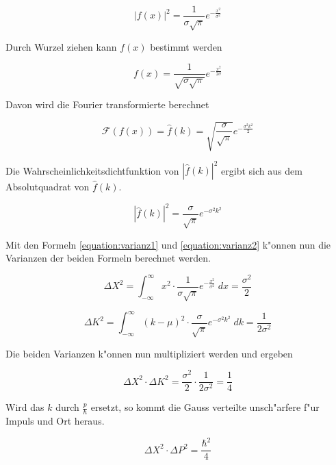 \begin{refsection}
\begin{equation}
	|f(x)|^{2}  = \dfrac{1}{\sigma \sqrt{\pi}}e^{-\frac{x^{2}}{\sigma^{2}}}
\end{equation}

Durch Wurzel ziehen kann $f(x)$ bestimmt werden

 \begin{equation}
 	f(x) =\dfrac{1}{\sqrt{\sigma\sqrt{\pi}} }e^{-\frac{x^{2}}{2\sigma}} 
 \end{equation}

Davon wird die Fourier transformierte berechnet
 
 \begin{equation}
 	\mathcal{F}(f(x)) = \hat{f}(k) = \sqrt{\dfrac{\sigma}{\sqrt{\pi}} }e^{-\frac{\sigma^{2} k^{2}}{2}}
 \end{equation}

Die Wahrscheinlichkeitsdichtfunktion von $|\hat{f}(k)|^{2}$ ergibt sich aus dem Absolutquadrat von $\hat{f}(k)$.

\begin{equation}
 	|\hat{f}(k)|^{2} = \dfrac{\sigma}{\sqrt{\pi} }e^{-\sigma^{2} k^{2}}
 \end{equation}

Mit den Formeln \ref{equation:varianz1} und \ref{equation:varianz2} k"onnen nun die Varianzen der beiden Formeln berechnet werden.

\begin{equation}	
	\varDelta X^{2} = \int_{-\infty}^{\infty} x^{2} \cdot \dfrac{1}{\sigma \sqrt{\pi}}e^{-\frac{x^{2}}{\sigma^{2}}} \; dx = \frac{\sigma^{2}}{2}
\end{equation}

\begin{equation}	
	\varDelta K^{2} = \int_{-\infty}^{\infty} (k-\mu)^{2} \cdot  \dfrac{\sigma}{\sqrt{\pi} }e^{-\sigma^{2} k^{2}} \; dk = \dfrac{1}{2\sigma^{2}}
\end{equation}

Die beiden Varianzen k"onnen nun multipliziert werden und ergeben

\begin{equation}	
	\varDelta X^{2} \cdot \varDelta K^{2} = \frac{\sigma^{2}}{2} \cdot \dfrac{1}{2\sigma^{2}} = \dfrac{1}{4}
\end{equation}

Wird das $k$ durch $\frac{p}{\hbar}$ ersetzt, so kommt die Gauss verteilte unsch"arfere f"ur Impuls und Ort heraus.

\begin{equation}	
	\varDelta X^{2} \cdot \varDelta P^{2} = \dfrac{\hbar^{2}}{4}
\end{equation}


\end{refsection}
